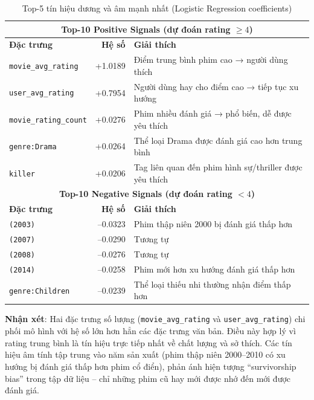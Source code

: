 \begin{table}[h]
\centering
\begin{tabular}{|l|r|l|}
\hline
\multicolumn{3}{|c|}{\textbf{Top-10 Positive Signals (dự đoán rating $\geq 4$)}} \\
\hline
\textbf{Đặc trưng} & \textbf{Hệ số} & \textbf{Giải thích} \\
\hline
\texttt{movie\_avg\_rating} & +1.0189 & Điểm trung bình phim cao → người dùng thích \\
\texttt{user\_avg\_rating}  & +0.7954 & Người dùng hay cho điểm cao → tiếp tục xu hướng \\
\texttt{movie\_rating\_count} & +0.0276 & Phim nhiều đánh giá → phổ biến, dễ được yêu thích \\
\texttt{genre:Drama}         & +0.0264 & Thể loại Drama được đánh giá cao hơn trung bình \\
\texttt{killer}              & +0.0206 & Tag liên quan đến phim hình sự/thriller được yêu thích \\
\hline
\multicolumn{3}{|c|}{\textbf{Top-10 Negative Signals (dự đoán rating $< 4$)}} \\
\hline
\textbf{Đặc trưng} & \textbf{Hệ số} & \textbf{Giải thích} \\
\hline
\texttt{(2003)}          & --0.0323 & Phim thập niên 2000 bị đánh giá thấp hơn \\
\texttt{(2007)}          & --0.0290 & Tương tự \\
\texttt{(2008)}          & --0.0276 & Tương tự \\
\texttt{(2014)}          & --0.0258 & Phim mới hơn xu hướng đánh giá thấp hơn \\
\texttt{genre:Children}  & --0.0239 & Thể loại thiếu nhi thường nhận điểm thấp hơn \\
\hline
\end{tabular}
\caption{Top-5 tín hiệu dương và âm mạnh nhất (Logistic Regression coefficients)}
\end{table}

\textbf{Nhận xét}: Hai đặc trưng số lượng (\texttt{movie\_avg\_rating} và \texttt{user\_avg\_rating}) chi phối mô hình với hệ số lớn hơn hẳn các đặc trưng văn bản. Điều này hợp lý vì rating trung bình là tín hiệu trực tiếp nhất về chất lượng và sở thích. Các tín hiệu âm tính tập trung vào năm sản xuất (phim thập niên 2000--2010 có xu hướng bị đánh giá thấp hơn phim cổ điển), phản ánh hiện tượng ``survivorship bias'' trong tập dữ liệu -- chỉ những phim cũ hay mới được nhớ đến mới được đánh giá.

